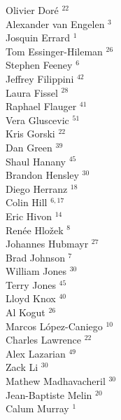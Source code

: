 \documentclass[PICOReport.tex]{subfiles}
\begin{document}
{\begin{multicols}{4}
Olivier Dor\'e $^{22}$                  \\
Alexander van Engelen $^{3}$           \\
Josquin Errard $^{1}$                  \\
Tom Essinger-Hileman $^{26}$            \\
Stephen Feeney $^{6}$                  \\
Jeffrey Filippini $^{42}$               \\
Laura Fissel $^{28}$                    \\
Raphael Flauger $^{41}$                 \\
Vera Gluscevic $^{51}$                  \\
Kris Gorski $^{22}$                     \\
Dan Green $^{39}$                       \\
Shaul Hanany $^{45}$                    \\
Brandon Hensley $^{30}$                 \\
Diego Herranz $^{18}$                   \\
Colin Hill $^{6,17}$                      \\
Eric Hivon $^{14}$                      \\
Ren\'{e}e  Hlo\v{z}ek $^{8}$           \\
Johannes Hubmayr $^{27}$                \\
Brad Johnson $^{7}$                    \\
William Jones $^{30}$                   \\
Terry Jones $^{45}$                     \\
Lloyd Knox $^{40}$                      \\
Al Kogut $^{26}$                        \\
Marcos L\'{o}pez-Caniego $^{10}$        \\
Charles Lawrence $^{22}$                \\
Alex Lazarian $^{49}$                   \\
Zack Li $^{30}$                         \\
Mathew Madhavacheril $^{30}$            \\
Jean-Baptiste Melin $^{20}$             \\
Calum Murray $^{1}$                    \\

\end{multicols}}
\end{document}
